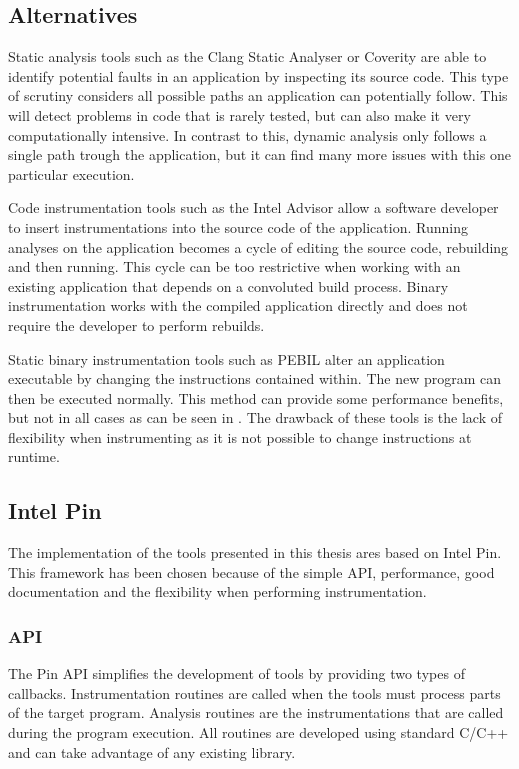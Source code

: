 \subsection{Alternatives}

Static analysis tools such as the Clang Static Analyser \cite{clang} or Coverity \cite{coverity} are able to identify potential faults in an application by inspecting its source code. This type of scrutiny considers all possible paths an application can potentially follow. This will detect problems in code that is rarely tested, but can also make it very computationally intensive. In contrast to this, dynamic analysis only follows a single path trough the application, but it can find many more issues with this one particular execution.

Code instrumentation tools such as the Intel Advisor \cite{inteladvisor} allow a software developer to insert instrumentations into the source code of the application. Running analyses on the application becomes a cycle of editing the source code, rebuilding and then running. This cycle can be too restrictive when working with an existing application that depends on a convoluted build process. Binary instrumentation works with the compiled application directly and does not require the developer to perform rebuilds.

Static binary instrumentation tools such as PEBIL \cite{pebil} alter an application executable by changing the instructions contained within. The new program can then be executed normally. This method can provide some performance benefits, but not in all cases as can be seen in \cite{pebilperf}. The drawback of these tools is the lack of flexibility when instrumenting as it is not possible to change instructions at runtime.

\subsection{Intel Pin}

The implementation of the tools presented in this thesis ares based on Intel Pin. This framework has been chosen because of the simple API, performance, good documentation and the flexibility when performing instrumentation.

\subsubsection{API}

The Pin API \cite{pindoc} simplifies the development of tools by providing two types of callbacks. Instrumentation routines are called when the tools must process parts of the target program. Analysis routines are the instrumentations that are called during the program execution. All routines are developed using standard C/C++ and can take advantage of any existing library.


